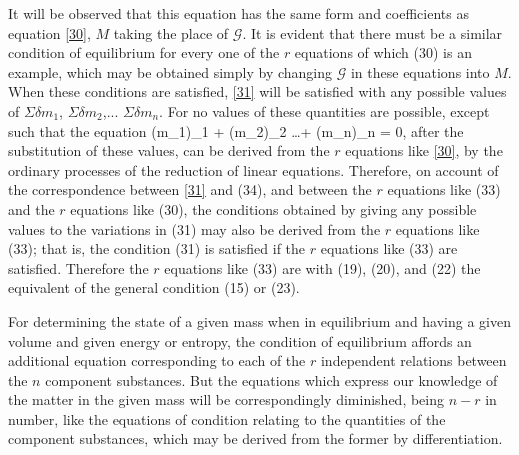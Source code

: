 \documentclass[12pt]{memoir}
\begin{document}
It will be observed that this equation has the same form and coefficients as equation \ref{30}, $M$ taking the place of $\mathcal{G}$. It is evident that there must be a similar condition of equilibrium for every one of the $r$ equations of which (30) is an example, which may be obtained simply by changing $\mathcal{G}$ in these equations into $M$. When these conditions are satisfied, \ref{31} will be satisfied with any possible values of $\Sigma \delta m_1$, $\Sigma \delta m_2$,... $\Sigma \delta m_n$. For no values of these quantities are possible, except such that the equation
\eqs (\Sigma \delta m_1)_1 + (\Sigma \delta m_2)_2 \dots + (\Sigma \delta m_n)_n = 0,     \label{34} \eqe
after the substitution of these values, can be derived from the $r$ equations like \ref{30}, by the ordinary processes of the reduction of linear equations. Therefore, on account of the correspondence between \ref{31} and (34), and between the $r$ equations like (33) and the $r$ equations like (30), the conditions obtained by giving any possible values to the variations in (31) may also be derived from the $r$ equations like (33); that is, the condition (31) is satisfied if the $r$ equations like (33) are satisfied. Therefore the $r$ equations like (33) are with (19), (20), and (22) the equivalent of the general condition (15) or (23).

For determining the state of a given mass when in equilibrium and having a given volume and given energy or entropy, the condition of equilibrium affords an additional equation corresponding to each of the $r$ independent relations between the $n$ component substances. But the equations which express our knowledge of the matter in the given mass will be correspondingly diminished, being $n-r$ in number, like the equations of condition relating to the quantities of the component substances, which may be derived from the former by differentiation.
\end{document}
